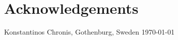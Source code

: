 \section*{Acknowledgements}

\hfill Konstantinos Chronis, Gothenburg, Sweden \today
\newpage
\clearpage
\mbox{}

